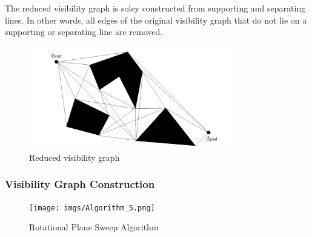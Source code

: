 \documentclass[11pt]{article}
\begin{document}
The reduced visibility graph is soley constructed from supporting and separating lines. In other words, all edges of the original visibility graph that do not lie on a supporting or separating line are removed. \\

\begin{figure}[h]
  \centering
  \includegraphics[width=9cm]{imgs/R_V_G.png}
  \caption{Reduced visibility graph}
\end{figure}

\subsubsection{Visibility Graph Construction}
\begin{figure}[h]
  \centering
  \texttt{[image: imgs/Algorithm\_5.png]}
  \caption{Rotational Plane Sweep Algorithm }
  \label{fig:Algorithm_5}
\end{figure}
\end{document}
